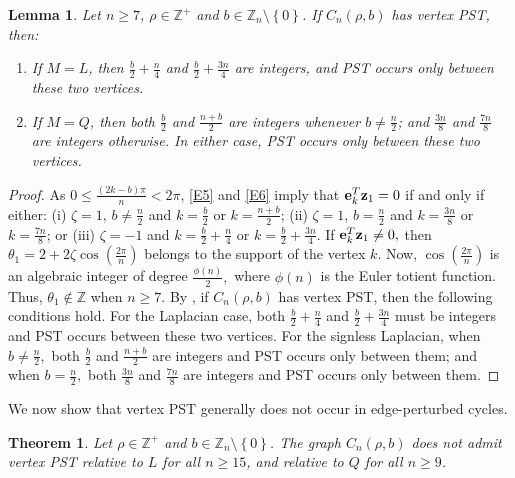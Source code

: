 \documentclass[12pt,a4paper]{article}
\newtheorem{thm}{Theorem}
\newtheorem{lem}{Lemma}
\def \e {{\mathbf e}}
\def \z {{\bf z}}
\newcommand{\ob}[1]{\left(#1\right)}
\newcommand{\cb}[1]{\left\lbrace #1\right\rbrace}
\begin{document}
\begin{lem}\label{L4}
Let $n \geq 7$, $\rho \in \mathbb{Z}^+$ and $b \in \mathbb{Z}_n\setminus \cb{0}$.
If $C_n (\rho, b)$ has vertex PST, then: 
\begin{enumerate}
  
  \item If $M=L$, then $\frac{b}{2} + \frac{n}{4}$ and $\frac{b}{2} + \frac{3n}{4}$ are integers, and PST occurs only between these two vertices.

   \item If $M=Q$, then both $\frac{b}{2}$ and $\frac{n + b}{2}$ are integers whenever $b \neq \frac{n}{2}$; and $\frac{3n}{8}$ and $\frac{7n}{8}$ are integers otherwise. In either case, PST occurs only between these two vertices.
   
\end{enumerate}
\end{lem}

\begin{proof}
As $0 \leq \frac{(2k - b)\pi}{n} < 2\pi$, \eqref{E5} and \eqref{E6} imply that $\e_k^T \z_1 = 0$ if and only if either: (i) $\zeta = 1$, $b \neq \frac{n}{2}$ and $k = \frac{b}{2}$ or $k = \frac{n + b}{2}$; (ii) $\zeta = 1$, $b = \frac{n}{2}$ and $k=\frac{3n}{8}$ or $k=\frac{7n}{8}$; or (iii) $\zeta = -1$ and $k = \frac{b}{2} + \frac{n}{4}$ or $k = \frac{b}{2} + \frac{3n}{4}$. If $\e_k^T \z_1 \neq 0,$ then $\theta_1= 2+2\zeta \cos \ob{\frac{2\pi}{n}}$ belongs to the support of the vertex $k.$ Now, $\cos\ob{\frac{2\pi}{n}}$ is an algebraic integer of degree $\frac{\phi(n)}{2},$ where $\phi(n)$ is the Euler totient function. Thus, $\theta_1\notin\mathbb{Z}$ when $n \geq 7.$ By \cite[Theorem 4]{kirk4}, if $C_n (\rho, b)$ has vertex PST, then the following conditions hold. For the Laplacian case, both $\frac{b}{2} + \frac{n}{4}$ and $\frac{b}{2} + \frac{3n}{4}$ must be integers and PST occurs between these two vertices. For the signless Laplacian, when $b \neq \frac{n}{2},$ both $\frac{b}{2}$ and $\frac{n + b}{2}$ are integers and PST occurs only between them; and when $b = \frac{n}{2},$ both $\frac{3n}{8}$ and $\frac{7n}{8}$ are integers and PST occurs only between them.
\end{proof}

We now show that vertex PST generally does not occur in edge-perturbed cycles.

\begin{thm}\label{T4}
Let $\rho \in \mathbb{Z}^+$ and $b \in \mathbb{Z}_n\setminus \cb{0}$. The graph $C_n (\rho, b)$
does not admit vertex PST relative to $L$
for all $n \geq 15$, and relative to $Q$ for all $n \geq 9$.
\end{thm}
\end{document}
